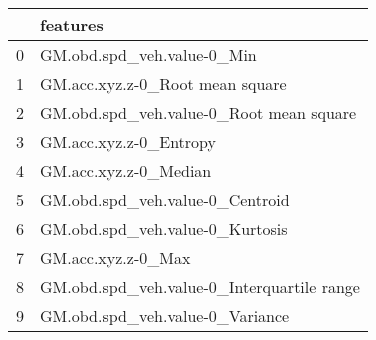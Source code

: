 \begin{tabular}{ll}
\toprule
{} &                                    features \\
\midrule
0 &                  GM.obd.spd\_veh.value-0\_Min \\
1 &             GM.acc.xyz.z-0\_Root mean square \\
2 &     GM.obd.spd\_veh.value-0\_Root mean square \\
3 &                      GM.acc.xyz.z-0\_Entropy \\
4 &                       GM.acc.xyz.z-0\_Median \\
5 &             GM.obd.spd\_veh.value-0\_Centroid \\
6 &             GM.obd.spd\_veh.value-0\_Kurtosis \\
7 &                          GM.acc.xyz.z-0\_Max \\
8 &  GM.obd.spd\_veh.value-0\_Interquartile range \\
9 &             GM.obd.spd\_veh.value-0\_Variance \\
\bottomrule
\end{tabular}
